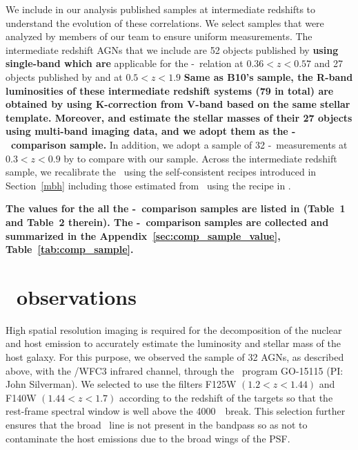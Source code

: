 \documentclass[apj]{emulateapj}
\begin{document}
We include in our analysis published samples at intermediate redshifts to understand the evolution of these correlations. We select samples that were analyzed by members of our team to ensure uniform measurements. The intermediate redshift AGNs that we include are 52 objects published by \citet{Park15} {\bf using single-band which are} applicable for the \mbh-\lhost\ relation at $0.36<z<0.57$ and 27 objects published by \citet{Bennert11} and \citet{SS13} at $0.5<z<1.9$ {\bf Same as B10's sample, the R-band luminosities of these intermediate redshift systems (79 in total) are obtained by \citet{Ding2017b} using K-correction from V-band based on the same stellar template. Moreover, \citet{Bennert11} and \citet{SS13} estimate the stellar masses of their 27 objects using multi-band imaging data, and we adopt them as the \mbh-\smass\ comparison sample.}
 In addition, we adopt a sample of 32 \mbh-\smass\ measurements at $0.3<z<0.9$ by \citet{Cisternas2011} to compare with our sample. Across the intermediate redshift sample, we recalibrate the \mbh\ using the self-consistent recipes introduced in Section~\ref{mbh} including those estimated from \Mgii\ using the recipe in \citet{Ding2017b}. 

{\bf The values for the all the \mbh-\lhost\ comparison samples are listed in \citet{Ding2017b} (Table~1 and Table~2 therein). The \mbh-\smass\ comparison samples are collected and summarized in the Appendix~\ref{sec:comp_sample_value}, Table~\ref{tab:comp_sample}.}

\section{\hst\ observations}
\label{observation}
High spatial resolution imaging is required for the decomposition of the nuclear and host emission to accurately estimate the luminosity and stellar mass of the host galaxy. For this purpose, we observed the sample of 32 AGNs, as described above, with the \hst/WFC3 infrared channel, through the \hst\ program GO-15115 (PI: John Silverman). We selected to use the filters F125W $(1.2<z<1.44)$ and F140W $(1.44<z<1.7)$ according to the redshift of the targets so that the rest-frame spectral window is well above the 4000~\angstrom\ break. This selection further ensures that the broad \halpha\ line is not present in the bandpass so as not to contaminate the host emissions due to the broad wings of the PSF.
\end{document}
